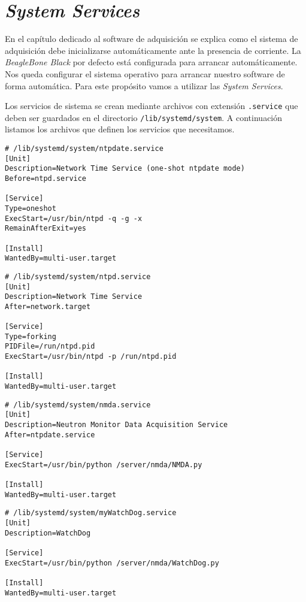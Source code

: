 	\section{\emph{System Services}}
		\label{appendix:systemctl}
		En el capítulo dedicado al software de adquisición se explica como el sistema de adquisición debe inicializarse automáticamente ante
		la presencia de corriente. La \emph{BeagleBone Black} por defecto está configurada para arrancar automáticamente. Nos queda configurar el
		sistema operativo para arrancar nuestro software de forma automática. Para este propósito vamos a utilizar las \emph{System Services}. 
		\par
		Los servicios de sistema se crean mediante archivos con extensión \texttt{.service} que deben ser guardados en el directorio
		\texttt{/lib/systemd/system}. A continuación listamos los archivos que definen los servicios que necesitamos.
		\begin{lstlisting}[style=myFile]
# /lib/systemd/system/ntpdate.service
[Unit]
Description=Network Time Service (one-shot ntpdate mode)
Before=ntpd.service

[Service]
Type=oneshot
ExecStart=/usr/bin/ntpd -q -g -x
RemainAfterExit=yes

[Install]
WantedBy=multi-user.target
		\end{lstlisting}
		\begin{lstlisting}[style=myFile]
# /lib/systemd/system/ntpd.service
[Unit]
Description=Network Time Service
After=network.target

[Service]
Type=forking
PIDFile=/run/ntpd.pid
ExecStart=/usr/bin/ntpd -p /run/ntpd.pid

[Install]
WantedBy=multi-user.target
		\end{lstlisting}
		\begin{lstlisting}[style=myFile]
# /lib/systemd/system/nmda.service
[Unit]
Description=Neutron Monitor Data Acquisition Service
After=ntpdate.service

[Service]
ExecStart=/usr/bin/python /server/nmda/NMDA.py

[Install]
WantedBy=multi-user.target
		\end{lstlisting}
		\begin{lstlisting}[style=myFile]
# /lib/systemd/system/myWatchDog.service         
[Unit]
Description=WatchDog

[Service]
ExecStart=/usr/bin/python /server/nmda/WatchDog.py

[Install]
WantedBy=multi-user.target
		\end{lstlisting}
